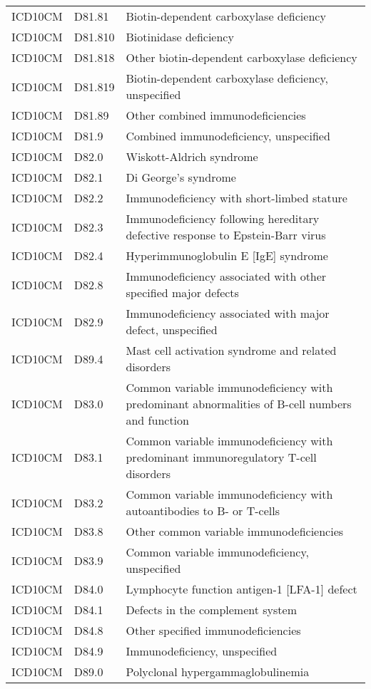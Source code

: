 \begin{table}[ht]
\begin{tabular}{lll}
  ICD10CM & D81.81 & Biotin-dependent carboxylase deficiency \\ 
  ICD10CM & D81.810 & Biotinidase deficiency \\ 
  ICD10CM & D81.818 & Other biotin-dependent carboxylase deficiency \\ 
  ICD10CM & D81.819 & Biotin-dependent carboxylase deficiency, unspecified \\ 
  ICD10CM & D81.89 & Other combined immunodeficiencies \\ 
  ICD10CM & D81.9 & Combined immunodeficiency, unspecified \\ 
  ICD10CM & D82.0 & Wiskott-Aldrich syndrome \\ 
  ICD10CM & D82.1 & Di George's syndrome \\ 
  ICD10CM & D82.2 & Immunodeficiency with short-limbed stature \\ 
  ICD10CM & D82.3 & Immunodeficiency following hereditary defective response to Epstein-Barr virus \\ 
  ICD10CM & D82.4 & Hyperimmunoglobulin E [IgE] syndrome \\ 
  ICD10CM & D82.8 & Immunodeficiency associated with other specified major defects \\ 
  ICD10CM & D82.9 & Immunodeficiency associated with major defect, unspecified \\ 
  ICD10CM & D89.4 & Mast cell activation syndrome and related disorders \\ 
  ICD10CM & D83.0 & Common variable immunodeficiency with predominant abnormalities of B-cell numbers and function \\ 
  ICD10CM & D83.1 & Common variable immunodeficiency with predominant immunoregulatory T-cell disorders \\ 
  ICD10CM & D83.2 & Common variable immunodeficiency with autoantibodies to B- or T-cells \\ 
  ICD10CM & D83.8 & Other common variable immunodeficiencies \\ 
  ICD10CM & D83.9 & Common variable immunodeficiency, unspecified \\ 
  ICD10CM & D84.0 & Lymphocyte function antigen-1 [LFA-1] defect \\ 
  ICD10CM & D84.1 & Defects in the complement system \\ 
  ICD10CM & D84.8 & Other specified immunodeficiencies \\ 
  ICD10CM & D84.9 & Immunodeficiency, unspecified \\ 
  ICD10CM & D89.0 & Polyclonal hypergammaglobulinemia \\ 

\end{tabular}
\end{table}
